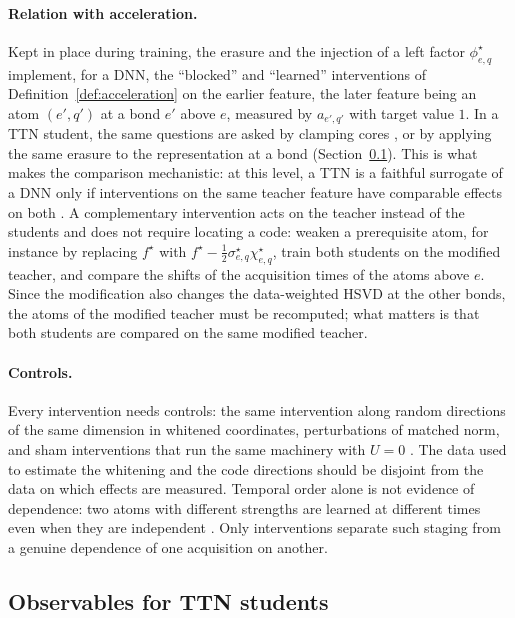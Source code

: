 \documentclass[11pt]{article}
\theoremstyle{definition}
\numberwithin{equation}{section}
\begin{document}
\paragraph{Relation with acceleration.}
Kept in place during training, the erasure and the injection of a left factor $\phi^\star_{e,q}$ implement, for a DNN, the ``blocked'' and ``learned'' interventions of Definition~\ref{def:acceleration} on the earlier feature, the later feature being an atom $(e',q')$ at a bond $e'$ above $e$, measured by $a_{e',q'}$ with target value $1$. In a TTN student, the same questions are asked by clamping cores \citep[Section~3]{hfl_diagonal}, or by applying the same erasure to the representation at a bond (Section~\ref{sec:ttn-students}). This is what makes the comparison mechanistic: at this level, a TTN is a faithful surrogate of a DNN only if interventions on the same teacher feature have comparable effects on both \citep[Section~7.6]{hfl_surrogate}. A complementary intervention acts on the teacher instead of the students and does not require locating a code: weaken a prerequisite atom, for instance by replacing $f^\star$ with $f^\star-\frac12\sigma^\star_{e,q}\chi^\star_{e,q}$, train both students on the modified teacher, and compare the shifts of the acquisition times of the atoms above $e$. Since the modification also changes the data-weighted HSVD at the other bonds, the atoms of the modified teacher must be recomputed; what matters is that both students are compared on the same modified teacher.

\paragraph{Controls.}
Every intervention needs controls: the same intervention along random directions of the same dimension in whitened coordinates, perturbations of matched norm, and sham interventions that run the same machinery with $U=0$ \citep[Section~3.3]{hfl_diagonal}. The data used to estimate the whitening and the code directions should be disjoint from the data on which effects are measured. Temporal order alone is not evidence of dependence: two atoms with different strengths are learned at different times even when they are independent \citep[Section~3.2]{hfl_diagonal}. Only interventions separate such staging from a genuine dependence of one acquisition on another.

\subsection{Observables for TTN students}\label{sec:ttn-students}
\end{document}
